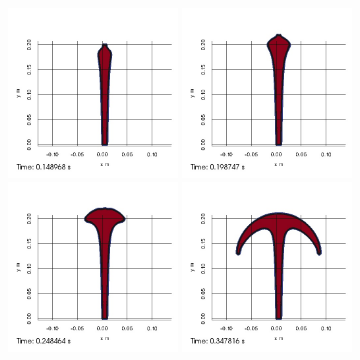 \begin{figure}
\begin{center}
\subcaptionbox{\label{top:jet:G:1}}
{
\includegraphics[width=0.4\textwidth]{topology/JetGrand/topo0001.jpg}
}
\subcaptionbox{\label{top:jet:G:2}}
{
\includegraphics[width=0.4\textwidth]{topology/JetGrand/topo0002.jpg}
}
\subcaptionbox{\label{top:jet:G:3}}
{
\includegraphics[width=0.4\textwidth]{topology/JetGrand/topo0003.jpg}
}
\subcaptionbox{\label{top:jet:G:4}}
{
\includegraphics[width=0.4\textwidth]{topology/JetGrand/topo0004.jpg}
}
\end{center}
\end{figure}
